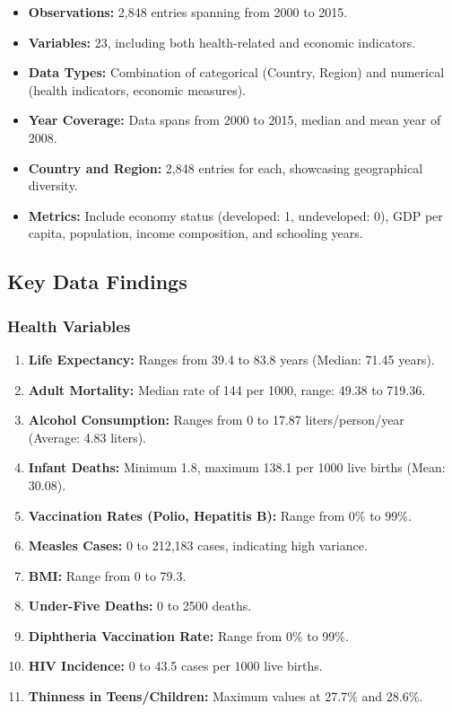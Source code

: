 \documentclass[
]{article}
\providecommand{\tightlist}{%
  \setlength{\itemsep}{0pt}\setlength{\parskip}{0pt}}
\begin{document}
\begin{itemize}
\tightlist
\item
  \textbf{Observations:} 2,848 entries spanning from 2000 to 2015.
\item
  \textbf{Variables:} 23, including both health-related and economic
  indicators.
\item
  \textbf{Data Types:} Combination of categorical (Country, Region) and
  numerical (health indicators, economic measures).
\item
  \textbf{Year Coverage:} Data spans from 2000 to 2015, median and mean
  year of 2008.
\item
  \textbf{Country and Region:} 2,848 entries for each, showcasing
  geographical diversity.
\item
  \textbf{Metrics:} Include economy status (developed: 1, undeveloped:
  0), GDP per capita, population, income composition, and schooling
  years.
\end{itemize}

\hypertarget{key-data-findings}{%
\subsection{Key Data Findings}\label{key-data-findings}}

\hypertarget{health-variables}{%
\subsubsection{Health Variables}\label{health-variables}}

\begin{enumerate}
\def\labelenumi{\arabic{enumi}.}
\tightlist
\item
  \textbf{Life Expectancy:} Ranges from 39.4 to 83.8 years (Median:
  71.45 years).
\item
  \textbf{Adult Mortality:} Median rate of 144 per 1000, range: 49.38 to
  719.36.
\item
  \textbf{Alcohol Consumption:} Ranges from 0 to 17.87
  liters/person/year (Average: 4.83 liters).
\item
  \textbf{Infant Deaths:} Minimum 1.8, maximum 138.1 per 1000 live
  births (Mean: 30.08).
\item
  \textbf{Vaccination Rates (Polio, Hepatitis B):} Range from 0\% to
  99\%.
\item
  \textbf{Measles Cases:} 0 to 212,183 cases, indicating high variance.
\item
  \textbf{BMI:} Range from 0 to 79.3.
\item
  \textbf{Under-Five Deaths:} 0 to 2500 deaths.
\item
  \textbf{Diphtheria Vaccination Rate:} Range from 0\% to 99\%.
\item
  \textbf{HIV Incidence:} 0 to 43.5 cases per 1000 live births.
\item
  \textbf{Thinness in Teens/Children:} Maximum values at 27.7\% and
  28.6\%.
\end{enumerate}
\end{document}
